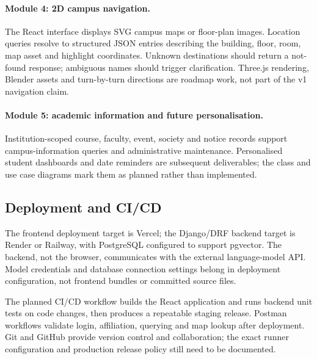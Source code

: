 \documentclass{tietreport}
\begin{document}
\paragraph{Module 4: 2D campus navigation.}
The React interface displays SVG campus maps or floor-plan images. Location
queries resolve to structured JSON entries describing the building, floor,
room, map asset and highlight coordinates. Unknown destinations should return
a not-found response; ambiguous names should trigger clarification. Three.js
rendering, Blender assets and turn-by-turn directions are roadmap work, not
part of the v1 navigation claim.

\paragraph{Module 5: academic information and future personalisation.}
Institution-scoped course, faculty, event, society and notice records support
campus-information queries and administrative maintenance. Personalised
student dashboards and date reminders are subsequent deliverables; the class
and use case diagrams mark them as planned rather than implemented.

\subsection{Deployment and CI/CD}

The frontend deployment target is Vercel; the Django/DRF backend target is
Render or Railway, with PostgreSQL configured to support pgvector. The
backend, not the browser, communicates with the external language-model API.
Model credentials and database connection settings belong in deployment
configuration, not frontend bundles or committed source files.

The planned CI/CD workflow builds the React application and runs backend unit
tests on code changes, then produces a repeatable staging release. Postman
workflows validate login, affiliation, querying and map lookup after deployment.
Git and GitHub provide version control and collaboration; the exact runner
configuration and production release policy still need to be documented.
\end{document}
